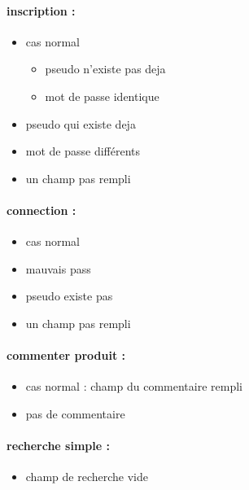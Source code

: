 \paragraph{inscription : }
\begin{itemize}
	\item cas normal
	\begin{itemize}
		\item pseudo n'existe pas deja
		\item mot de passe identique
	\end{itemize}
	\item pseudo qui existe deja
	\item mot de passe différents
	\item un champ pas rempli
\end{itemize}

\paragraph{connection : }
\begin{itemize}
	\item cas normal
	\item mauvais pass
	\item pseudo existe pas
	\item un champ pas rempli
\end{itemize}

\paragraph{commenter produit :}
\begin{itemize}
	\item cas normal : champ du commentaire rempli
	\item pas de commentaire
\end{itemize}

\paragraph{recherche simple :}
\begin{itemize}	
	\item champ de recherche vide
\end{itemize}

